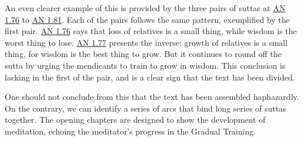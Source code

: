 \documentclass[12pt,openany]{book}%
\begin{document}
An even clearer example of this is provided by the three pairs of suttas at \href{https://suttacentral.net/an1.76}{AN 1.76} to \href{https://suttacentral.net/an1.81}{AN 1.81}. Each of the pairs follows the same pattern, exemplified by the first pair. \href{https://suttacentral.net/an1.76}{AN 1.76} says that loss of relatives is a small thing, while wisdom is the worst thing to lose. \href{https://suttacentral.net/an1.77}{AN 1.77} presents the inverse: growth of relatives is a small thing, for wisdom is the best thing to grow. But it continues to round off the sutta by urging the mendicants to train to grow in wisdom. This conclusion is lacking in the first of the pair, and is a clear sign that the text has been divided.

One should not conclude from this that the text has been assembled haphazardly. On the contrary, we can identify a series of arcs that bind long series of suttas together. The opening chapters are designed to show the development of meditation, echoing the meditator’s progress in the Gradual Training.
\end{document}
